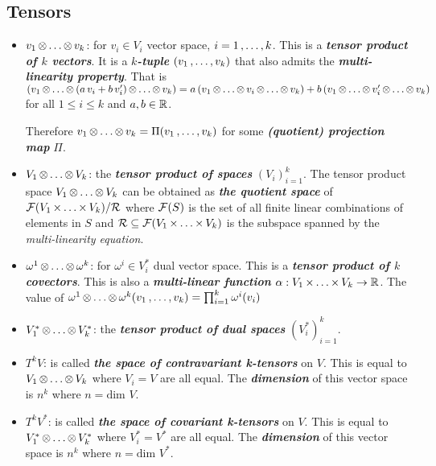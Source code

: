 \documentclass[11pt]{article}
\begin{document}
\subsection{Tensors}
\begin{itemize}
\item $v_1 \,{\otimes}\ldots{\otimes}\, v_k$: \quad for $v_i \in V_i$ vector space, $i=1 \,{,}\ldots{,}\, k$. This is a \emph{\textbf{tensor product of $k$ vectors}}. It is a \emph{\textbf{$k$-tuple}} $(v_1 \,{,}\ldots{,}\, v_k)$ that also admits the \emph{\textbf{multi-linearity property}}. That is $(v_1 \,{\otimes}\ldots{\otimes}\, (a\,v_i + b\,v_{i}')  \,{\otimes}\ldots{\otimes}\, v_k) = a\,( v_1 \,{\otimes}\ldots{\otimes}\, v_i  \,{\otimes}\ldots{\otimes}\, v_k)  + b\, (v_1 \,{\otimes}\ldots{\otimes}\, v_{i}'  \,{\otimes}\ldots{\otimes}\, v_k)$ for all $1\le i\le k$ and $a, b\in {\mathbb R}$. 

Therefore $v_1 \,{\otimes}\ldots{\otimes}\, v_k = \Pi(v_1 \,{,}\ldots{,}\, v_k)$ for some \emph{\textbf{(quotient) projection map}} $\Pi$.

\item $V_1 \,{\otimes}\ldots{\otimes}\, V_k$: \quad the \emph{\textbf{tensor product of spaces}} $(V_i)_{i=1}^{k}$. The tensor product space $V_1 \,{\otimes}\ldots{\otimes}\, V_k$ can be obtained as \emph{\textbf{the quotient space}} of ${\mathcal F}(V_1 \,{\times}\ldots{\times}\, V_k) / {\mathcal R}$ where ${\mathcal F}(S)$ is the set of all finite linear combinations of elements in $S$ and ${\mathcal R} \subseteq {\mathcal F}(V_1 \,{\times}\ldots{\times}\, V_k)$ is the subspace spanned by the \emph{multi-linearity equation}.

\item $\omega^1 \,{\otimes}\ldots{\otimes}\, \omega^k$: \quad for $\omega^i \in V_i^{*}$ dual vector space. This is a \emph{\textbf{tensor product of $k$ covectors}}. This is also a \emph{\textbf{multi-linear function}} $\alpha: V_1 \,{\times}\ldots{\times}\, V_k \rightarrow {\mathbb R}$. The value of $\omega^1 \,{\otimes}\ldots{\otimes}\, \omega^k(v_1 \,{,}\ldots{,}\, v_k) = \prod_{i=1}^{k}\omega^i(v_i)$

\item $V_1^{*} \,{\otimes}\ldots{\otimes}\, V_k^{*}$: \quad the \emph{\textbf{tensor product of dual spaces}} $(V_i^{*})_{i=1}^{k}$. 

\item $T^{k}V$: \quad is called \emph{\textbf{the space of contravariant k-tensors}} on $V$.  This is equal to $V_1 \,{\otimes}\ldots{\otimes}\, V_k$ where $V_i = V$ are all equal. The \emph{\textbf{dimension}} of this vector space is $n^k$ where $n= \text{dim }V$.

\item $T^{k}V^{*}$: \quad  is called \emph{\textbf{the space of covariant k-tensors}} on $V$.  This is equal to $V_1^{*} \,{\otimes}\ldots{\otimes}\, V_k^{*}$ where $V_i^{*} = V^{*}$ are all equal. The \emph{\textbf{dimension}} of this vector space is $n^k$ where $n= \text{dim }V^{*}$.


\end{itemize}
\end{document}
